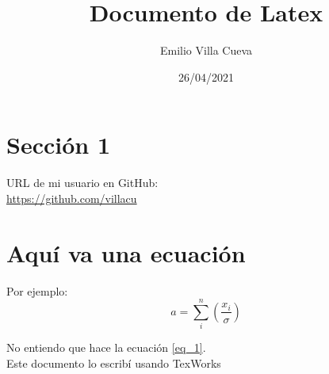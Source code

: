 \documentclass{article}
\title{Documento de Latex}
\author{Emilio Villa Cueva}
\date{26/04/2021}
\begin{document}
\maketitle
\section{Sección 1}
URL de mi usuario en GitHub:\\
\url{https://github.com/villacu}
\section{Aquí va una ecuación}
Por ejemplo:
\begin{equation}
	a =\sum_i^n\left(\frac{x_i}{\sigma}\right)
	\label{eq_1}
\end{equation}

No entiendo que hace la ecuación \ref{eq_1}.\\
Este documento lo escribí usando TexWorks
\end{document}
